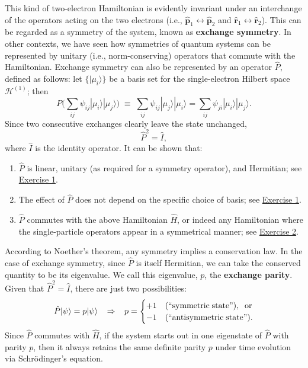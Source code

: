 \documentclass[pra,11pt]{revtex4}
\begin{document}
This kind of two-electron Hamiltonian is evidently invariant under an
interchange of the operators acting on the two electrons (i.e.,
$\hat{\mathbf{p}}_1 \leftrightarrow \hat{\mathbf{p}}_2$ and
$\hat{\mathbf{r}}_1 \leftrightarrow \hat{\mathbf{r}}_2$).  This can be
regarded as a symmetry of the system, known as \textbf{exchange
  symmetry}.  In other contexts, we have seen how symmetries of
quantum systems can be represented by unitary (i.e., norm-conserving)
operators that commute with the Hamiltonian.  Exchange symmetry can
also be represented by an operator $\hat{P}$, defined as follows: let
$\{|\mu_i\rangle\}$ be a basis set for the single-electron Hilbert
space $\mathscr{H}^{(1)}$; then
$$P \Big (\sum_{ij} \psi_{ij} |\mu_i\rangle|\mu_j\rangle \Big)
\;\equiv\;  \sum_{ij} \psi_{ij} |\mu_j\rangle|\mu_i\rangle = \sum_{ij} \psi_{ji} |\mu_i\rangle|\mu_j\rangle.$$
Since two consecutive exchanges clearly leave the state unchanged,
$$\hat{P}^2 = \hat{I},$$
where $\hat{I}$ is the identity operator.  It can be shown that:
\begin{enumerate}
\item $\hat{P}$ is linear, unitary (as required for a symmetry
  operator), and Hermitian; see \hyperref[ex:1]{Exercise 1}.
  
\item The effect of $\hat{P}$ does not depend on the specific choice
  of basis; see \hyperref[ex:1]{Exercise 1}.

\item $\hat{P}$ commutes with the above Hamiltonian $\hat{H}$, or
  indeed any Hamiltonian where the single-particle operators appear in
  a symmetrical manner; see \hyperref[ex:2]{Exercise 2}.
\end{enumerate}

According to Noether's theorem, any symmetry implies a conservation
law.  In the case of exchange symmetry, since $\hat{P}$ is itself
Hermitian, we can take the conserved quantity to be its eigenvalue.
We call this eigenvalue, $p$, the \textbf{exchange parity}.  Given
that $\hat{P}^2 = \hat{I}$, there are just two possibilities:
$$\hat{P} |\psi\rangle = p|\psi\rangle \;\;\;\Rightarrow\;\;\; p = \begin{cases}+1 & \textrm{(``symmetric\;state'')}, \;\;\textrm{or} \\ -1 & \textrm{(``antisymmetric\;state'').}\end{cases}$$
Since $\hat{P}$ commutes with $\hat{H}$, if the system starts out in
one eigenstate of $\hat{P}$ with parity $p$, then it always retains
the same definite parity $p$ under time evolution via Schr\"odinger's
equation.
\end{document}
